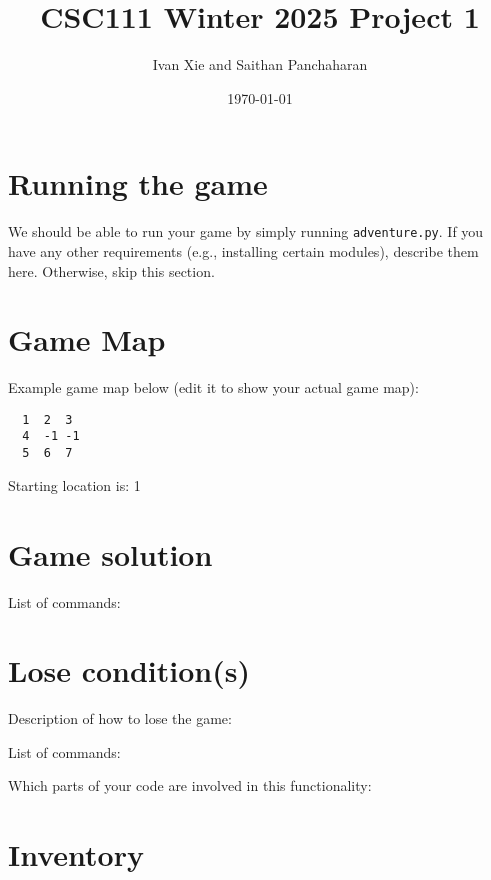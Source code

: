 \documentclass[11pt]{article}
\title{CSC111 Winter 2025 Project 1}
\author{Ivan Xie and Saithan Panchaharan}
\date{\today}
\begin{document}
\maketitle

\section*{Running the game}
We should be able to run your game by simply running \texttt{adventure.py}. If you have any other requirements (e.g., installing certain modules), describe them here. Otherwise, skip this section.

\section*{Game Map}
Example game map below (edit it to show your actual game map):

\begin{verbatim}
  1  2  3
  4  -1 -1
  5  6  7
\end{verbatim}

Starting location is: 1

\section*{Game solution}
List of commands:

\section*{Lose condition(s)}
Description of how to lose the game:

List of commands:

Which parts of your code are involved in this functionality:


\section*{Inventory}
\end{document}
